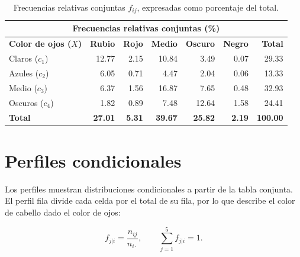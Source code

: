 \begin{table}[H]
\centering
\small
\setlength{\tabcolsep}{5pt}
\renewcommand{\arraystretch}{1.15}
\begin{tabular}{|l|r|r|r|r|r|r|}
\hline
\multicolumn{7}{|c|}{\textbf{Frecuencias relativas conjuntas (\%)}} \\ \hline
\textbf{Color de ojos ($X$)} & \textbf{Rubio} & \textbf{Rojo} & \textbf{Medio} & \textbf{Oscuro} & \textbf{Negro} & \textbf{Total} \\ \hline
Claros ($c_1$)  & 12.77 & 2.15 & 10.84 & 3.49 & 0.07 & 29.33 \\ \hline
Azules ($c_2$)  & 6.05 & 0.71 & 4.47 & 2.04 & 0.06 & 13.33 \\ \hline
Medio ($c_3$)   & 6.37 & 1.56 & 16.87 & 7.65 & 0.48 & 32.93 \\ \hline
Oscuros ($c_4$) & 1.82 & 0.89 & 7.48 & 12.64 & 1.58 & 24.41 \\ \hline
\textbf{Total} & \textbf{27.01} & \textbf{5.31} & \textbf{39.67} & \textbf{25.82} & \textbf{2.19} & \textbf{100.00} \\ \hline
\end{tabular}
\caption{Frecuencias relativas conjuntas $f_{ij}$, expresadas como porcentaje del total.}
\label{tab:ojos-cabello-relativas}
\end{table}

\section{Perfiles condicionales}

Los perfiles muestran distribuciones condicionales a partir de la tabla conjunta. El perfil fila divide cada celda por el total de su fila, por lo que describe el color de cabello dado el color de ojos:

\begin{equation*}
f_{j|i}=\frac{n_{ij}}{n_{i\cdot}},\qquad \sum_{j=1}^{5}f_{j|i}=1.
\end{equation*}

